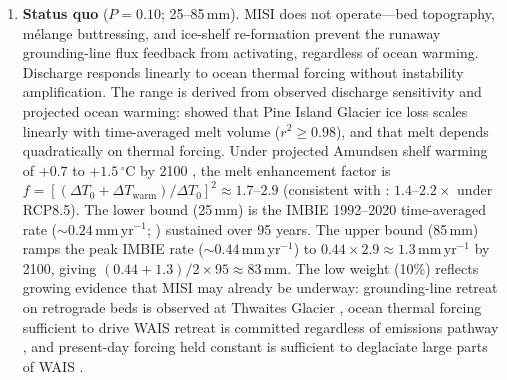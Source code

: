 \documentclass[11pt]{article}
\begin{document}
\begin{enumerate}
	\item[\textbf{S1.}] \textbf{Status quo} ($P = 0.10$; 25--85\,mm). MISI does not operate---bed topography, m\'{e}lange buttressing, and ice-shelf re-formation prevent the runaway grounding-line flux feedback from activating, regardless of ocean warming. Discharge responds linearly to ocean thermal forcing without instability amplification. The range is derived from observed discharge sensitivity and projected ocean warming: \citet{Joughin2021} showed that Pine Island Glacier ice loss scales linearly with time-averaged melt volume ($r^2 \geq 0.98$), and that melt depends quadratically on thermal forcing. Under projected Amundsen shelf warming of $+0.7$ to $+1.5\,^\circ$C by 2100 \citep{Naughten2023}, the melt enhancement factor is $f = [(\Delta T_0 + \Delta T_{\mathrm{warm}})/\Delta T_0]^2 \approx 1.7$--$2.9$ (consistent with \citealp{Jourdain2022}: $1.4$--$2.2\times$ under RCP8.5). The lower bound (25\,mm) is the IMBIE 1992--2020 time-averaged rate ($\sim\!0.24$\,mm\,yr$^{-1}$; \citealp{Otosaka2023}) sustained over 95 years. The upper bound (85\,mm) ramps the peak IMBIE rate ($\sim\!0.44$\,mm\,yr$^{-1}$) to $0.44 \times 2.9 \approx 1.3$\,mm\,yr$^{-1}$ by 2100, giving $(0.44 + 1.3)/2 \times 95 \approx 83$\,mm. The low weight (10\%) reflects growing evidence that MISI may already be underway: grounding-line retreat on retrograde beds is observed at Thwaites Glacier \citep{Joughin2014}, ocean thermal forcing sufficient to drive WAIS retreat is committed regardless of emissions pathway \citep{Naughten2023}, and present-day forcing held constant is sufficient to deglaciate large parts of WAIS \citep{vandenAkker2025}.


\end{enumerate}
\end{document}
